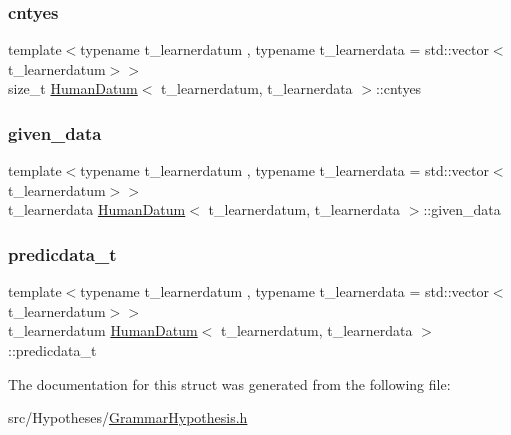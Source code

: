 \subsubsection{\texorpdfstring{cntyes}{cntyes}}
{\footnotesize\ttfamily template$<$typename t\+\_\+learnerdatum , typename t\+\_\+learnerdata  = std\+::vector$<$t\+\_\+learnerdatum$>$$>$ \\
size\+\_\+t \hyperlink{struct_human_datum}{Human\+Datum}$<$ t\+\_\+learnerdatum, t\+\_\+learnerdata $>$\+::cntyes}

\mbox{\label{struct_human_datum_aab13b229dfedb8c2466f47a58e710431}} 
\subsubsection{\texorpdfstring{given\+\_\+data}{given\_data}}
{\footnotesize\ttfamily template$<$typename t\+\_\+learnerdatum , typename t\+\_\+learnerdata  = std\+::vector$<$t\+\_\+learnerdatum$>$$>$ \\
t\+\_\+learnerdata \hyperlink{struct_human_datum}{Human\+Datum}$<$ t\+\_\+learnerdatum, t\+\_\+learnerdata $>$\+::given\+\_\+data}

\mbox{\label{struct_human_datum_a1c46fa659d01c8108fc694b4332836ff}} 
\subsubsection{\texorpdfstring{predicdata\+\_\+t}{predicdata\_t}}
{\footnotesize\ttfamily template$<$typename t\+\_\+learnerdatum , typename t\+\_\+learnerdata  = std\+::vector$<$t\+\_\+learnerdatum$>$$>$ \\
t\+\_\+learnerdatum \hyperlink{struct_human_datum}{Human\+Datum}$<$ t\+\_\+learnerdatum, t\+\_\+learnerdata $>$\+::predicdata\+\_\+t}



The documentation for this struct was generated from the following file\+:\begin{DoxyCompactItemize}
\item 
src/\+Hypotheses/\hyperlink{_grammar_hypothesis_8h}{Grammar\+Hypothesis.\+h}\end{DoxyCompactItemize}
